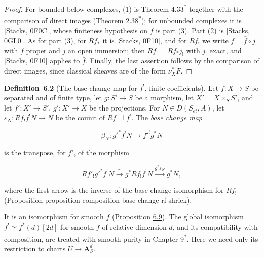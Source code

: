 \documentclass[11pt]{article}
\newenvironment{bpstatement}[2]{\par\addvspace{0.6\baselineskip}\noindent\textbf{#1}#2\textbf{.}\enspace\ignorespaces}
  {\par\addvspace{0.4\baselineskip}}
\newcommand{\bpout}[1]{#1\textsuperscript{\hyperlink{bp-outside}{\ensuremath{\ast}}}}
\begin{document}
\begin{proof}[{Proof}]\label{bp6}%
For bounded below complexes, (1) is Theorem \bpout{4.33} together with the comparison of direct images (Theorem \bpout{2.38}); for unbounded complexes it is [Stacks, \href{https://stacks.math.columbia.edu/tag/0F0C}{0F0C}], whose finiteness hypothesis on \(f\) is part (3). Part (2) is [Stacks, \href{https://stacks.math.columbia.edu/tag/0GL0}{0GL0}]. As for part (3), for \(Rf_*\) it is [Stacks, \href{https://stacks.math.columbia.edu/tag/0F10}{0F10}], and for \(Rf_!\) we write \(f=\bar f\circ j\) with \(\bar f\) proper and \(j\) an open immersion; then \(Rf_!=R\bar f_*j_!\) with \(j_!\) exact, and [Stacks, \href{https://stacks.math.columbia.edu/tag/0F10}{0F10}] applies to \(\bar f\). Finally, the last assertion follows by the comparison of direct images, since classical sheaves are of the form \(\nu_X^*F\).
\end{proof}

\label{bp7}%
\begin{bpstatement}{Definition~6.2}{ (The base change map for $f^!$, finite coefficients)}
Let \(f:X\to S\) be separated and of finite type, let \(g:S'\to S\) be a morphism, let \(X'=X\times_SS'\), and let \(f':X'\to S'\), \(g':X'\to X\) be the projections. For \(N\in D(S_{\acute{e}t},A)\), let \(\varepsilon_N:Rf_!f^!N\to N\) be the counit of \(Rf_!\dashv f^!\). The \emph{base change map}

\[
\beta_N:g'^*f^!N\longrightarrow f'^!g^*N
\tag{6.1}
\]

is the transpose, for \(f'\), of the morphism

\[
Rf'_!g'^*f^!N
\xrightarrow{\ \sim\ }g^*Rf_!f^!N
\xrightarrow{g^*\varepsilon_N}g^*N,
\tag{6.2}
\]

where the first arrow is the inverse of the base change isomorphism for \(Rf_!\) (Proposition proposition-composition-base-change-rf-shriek).
\end{bpstatement}

\label{bp8}%
It is an isomorphism for smooth \(f\) (Proposition \hyperref[bp30]{6.9}). The global isomorphism \(f^!\simeq f^*(d)[2d]\) for smooth \(f\) of relative dimension \(d\), and its compatibility with composition, are treated with smooth purity in Chapter \bpout{9}. Here we need only its restriction to charts \(U\to\mathbf A^d_S\).
\end{document}
